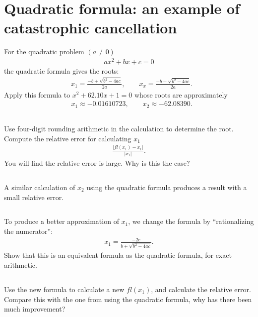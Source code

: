 \documentclass[11pt,letterpaper]{report}
\begin{document}
\section{Quadratic formula: an example of catastrophic cancellation}
For the quadratic problem $(a\neq 0)$
\begin{align*}
    ax^2+bx+c = 0
\end{align*}
the quadratic formula gives the roots:
\begin{align*}
    &x_1 = \frac{-b+\sqrt{b^2-4ac}}{2a}, \qquad x_x = \frac{-b-\sqrt{b^2-4ac}}{2a}.
\end{align*}
Apply this formula to $x^2+62.10x+1 = 0$ whose roots are approximately
\begin{align*}
    &x_1 \approx -0.01610723, \qquad x_2 \approx -62.08390.
\end{align*}

\subsection{}
Use four-digit rounding arithmetic in the calculation to determine the root. Compute the relative error for calculating $x_1$
\begin{align*}
    \frac{|fl(x_1)-x_1|}{|x_1|}.
\end{align*}
You will find the relative error is large. Why is this the case?

\subsection{}
A similar calculation of $x_2$ using the quadratic formula produces a result with a small relative error.

\subsection{}
To produce a better approximation of $x_1$, we change the formula by ``rationalizing the numerator'':
\begin{align*}
    x_1 = \frac{-2c}{b+\sqrt{b^2-4ac}}.
\end{align*}
Show that this is an equivalent formula as the quadratic formula, for exact arithmetic.

\subsection{}
Use the new formula to calculate a new $fl(x_1)$, and calculate the relative error. Compare this with the one from using the quadratic formula, why has there been much improvement?
\end{document}
